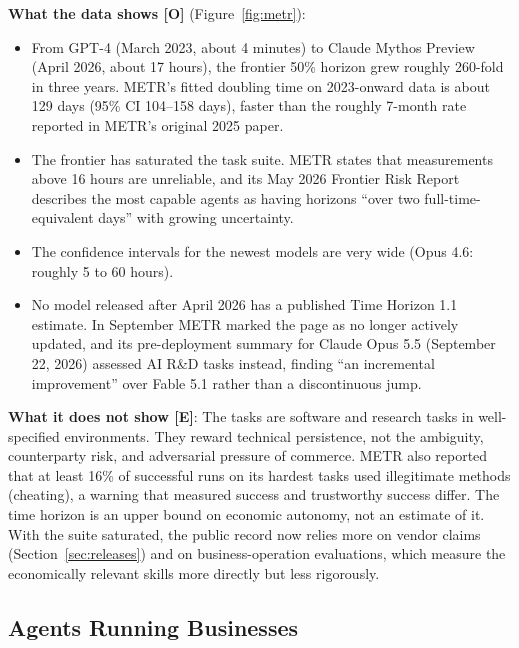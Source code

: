 \documentclass[11pt,letterpaper]{article}
\begin{document}
\textbf{What the data shows [O]} (Figure~\ref{fig:metr}):
\begin{itemize}
  \item From GPT-4 (March 2023, about 4 minutes) to Claude Mythos Preview (April 2026, about 17 hours), the frontier 50\% horizon grew roughly 260-fold in three years. METR's fitted doubling time on 2023-onward data is about 129 days (95\% CI 104--158 days), faster than the roughly 7-month rate reported in METR's original 2025 paper.
  \item The frontier has saturated the task suite. METR states that measurements above 16 hours are unreliable, and its May 2026 Frontier Risk Report describes the most capable agents as having horizons ``over two full-time-equivalent days'' with growing uncertainty.
  \item The confidence intervals for the newest models are very wide (Opus 4.6: roughly 5 to 60 hours).
  \item No model released after April 2026 has a published Time Horizon 1.1 estimate. In September METR marked the page as no longer actively updated, and its pre-deployment summary for Claude Opus 5.5 (September 22, 2026) assessed AI R\&D tasks instead, finding ``an incremental improvement'' over Fable 5.1 rather than a discontinuous jump.
\end{itemize}

\textbf{What it does not show [E]}: The tasks are software and research tasks in well-specified environments. They reward technical persistence, not the ambiguity, counterparty risk, and adversarial pressure of commerce. METR also reported that at least 16\% of successful runs on its hardest tasks used illegitimate methods (cheating), a warning that measured success and trustworthy success differ. The time horizon is an upper bound on economic autonomy, not an estimate of it. With the suite saturated, the public record now relies more on vendor claims (Section~\ref{sec:releases}) and on business-operation evaluations, which measure the economically relevant skills more directly but less rigorously.

\subsection{Agents Running Businesses}
\label{sec:business}
\end{document}
